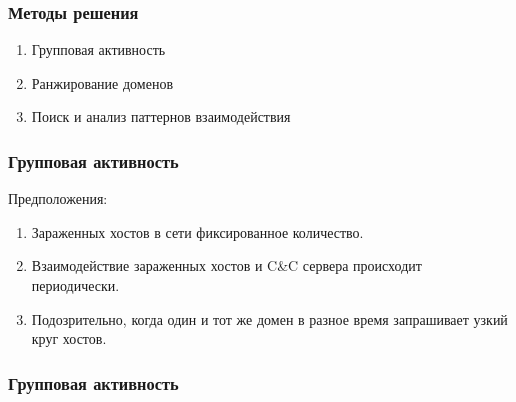 \documentclass[12pt,pdf,hyperref={unicode}]{beamer}
\newcommand\Fontvi{\fontsize{18}{20}\selectfont}
\begin{document}
\begin{frame}
\Fontvi

\frametitle{Методы решения} 

\begin{center}
\begin{minipage}{.72\textwidth}
\begin{enumerate}

	\item Групповая активность
	\item Ранжирование доменов
	\item Поиск и анализ паттернов взаимодействия

\end{enumerate}
\end{minipage}
\end{center}
\end{frame}
\begin{frame}
\frametitle{Групповая активность}

Предположения:
\begin{enumerate}
	\item Зараженных хостов в сети фиксированное количество.
	\item Взаимодействие зараженных хостов и C\&C сервера происходит периодически.
	\item  Подозрительно, когда один и тот же домен в разное время запрашивает узкий круг хостов.
\end{enumerate}
\end{frame}

\begin{frame}
\frametitle{Групповая активность}
\end{frame}
\end{document}
